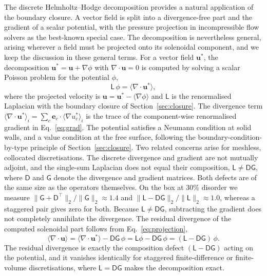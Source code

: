 \documentclass[preprint,review,12pt]{elsarticle}
\newcommand{\gradop}[1]{\langle\nabla #1\rangle}
\begin{document}
The discrete Helmholtz--Hodge decomposition provides a natural application of the boundary closure.
A vector field is split into a divergence-free part and the gradient of a scalar potential, with the pressure projection in incompressible flow solvers as the best-known special case.
The decomposition is nevertheless general, arising wherever a field must be projected onto its solenoidal component, and we keep the discussion in these general terms.
For a vector field $\mathbf u^\ast$, the decomposition $\mathbf u^\ast=\mathbf u+\nabla\phi$ with $\nabla\!\cdot\mathbf u=0$ is computed by solving a scalar Poisson problem for the potential $\phi$,
\begin{equation}
  \mathsf L\,\phi=\langle\nabla\!\cdot\mathbf u^\ast\rangle,
  \label{eq:projection}
\end{equation}
where the projected velocity is $\mathbf u=\mathbf u^\ast-\gradop{\phi}$ and $\mathsf L$ is the renormalised Laplacian with the boundary closure of Section~\ref{sec:closure}.
The divergence term $\langle\nabla\!\cdot\mathbf u^\ast\rangle_i=\sum_c\mathbf e_c\cdot\gradop{u^\ast_c}_i$ is the trace of the component-wise renormalised gradient in Eq.~\eqref{eq:grad}.
The potential satisfies a Neumann condition at solid walls, and a value condition at the free surface, following the boundary-condition-by-type principle of Section~\ref{sec:closure}.
Two related concerns arise for meshless, collocated discretisations.
The discrete divergence and gradient are not mutually adjoint, and the single-sum Laplacian does not equal their composition, $\mathsf L\neq\mathsf D\mathsf G$, where $\mathsf D$ and $\mathsf G$ denote the divergence and gradient matrices.
Both defects are of the same size as the operators themselves.
On the box at $30\%$ disorder we measure $\|\mathsf G+\mathsf D^\top\|_2/\|\mathsf G\|_2\approx1.4$ and $\|\mathsf L-\mathsf D\mathsf G\|_2/\|\mathsf L\|_2\approx1.0$, whereas a staggered pair gives zero for both.
Because $\mathsf L\neq\mathsf D\mathsf G$, subtracting the gradient does not completely annihilate the divergence.
The residual divergence of the computed solenoidal part follows from Eq.~\eqref{eq:projection},
\begin{equation}
  \langle\nabla\!\cdot\mathbf u\rangle
  =\langle\nabla\!\cdot\mathbf u^\ast\rangle-\mathsf D\mathsf G\,\phi
  =\mathsf L\phi-\mathsf D\mathsf G\,\phi
  =(\mathsf L-\mathsf D\mathsf G)\,\phi.
  \label{eq:projresidual}
\end{equation}
The residual divergence is exactly the composition defect $(\mathsf L-\mathsf D\mathsf G)$ acting on the potential, and it vanishes identically for staggered finite-difference or finite-volume discretisations, where $\mathsf L=\mathsf D\mathsf G$ makes the decomposition exact.
\end{document}
